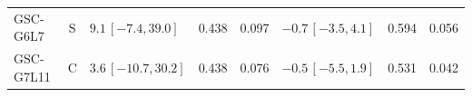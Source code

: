 \begin{longtable}{lcp{37mm}rrp{37mm}rr}
GSC-G6L7 & S & \(9.1\,[-7.4,39.0]\) & 0.438 & 0.097 & \(-0.7\,[-3.5,4.1]\) & 0.594 & 0.056\\
GSC-G7L11 & C & \(3.6\,[-10.7,30.2]\) & 0.438 & 0.076 & \(-0.5\,[-5.5,1.9]\) & 0.531 & 0.042\\

\end{longtable}
